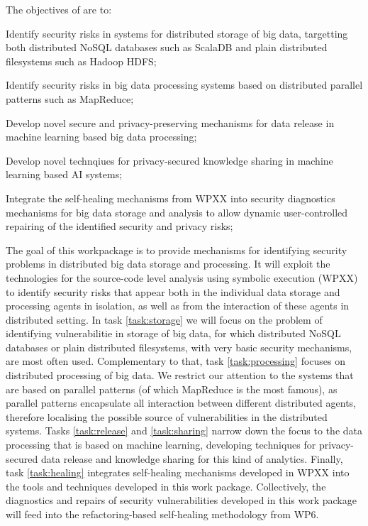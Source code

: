 \addtocounter{wpno}{1}
\begin{Workpackage}{\thewpno}
\WPTitle{\wpname{\thewpno}}


\begin{WPObjectives}
The objectives of \theWP{} are to:
\begin{compactitem}
\item Identify security risks in systems for distributed storage of big data, targetting both distributed NoSQL databases such as ScalaDB and plain distributed filesystems such as Hadoop HDFS;
\item Identify security risks in big data processing systems based on distributed parallel patterns such as MapReduce;
\item Develop novel secure and privacy-preserving mechanisms for data release in machine learning based big data processing; 
\item Develop novel technqiues for privacy-secured knowledge sharing in machine learning based AI systems; 
\item Integrate the self-healing mechanisms from WPXX into security diagnostics mechanisms for big data storage and analysis to allow dynamic user-controlled repairing of the identified security and privacy risks;  
\end{compactitem}
\end{WPObjectives}

\begin{WPDescription}
  The goal of this workpackage is to provide mechanisms for identifying security problems in distributed big data storage and processing. It will exploit the technologies for the source-code level analysis using symbolic execution (WPXX) to identify security risks that appear both in the individual data storage and processing agents in isolation, as well as from the interaction of these agents in distributed setting. In task \ref{task:storage} we will focus on the problem of identifying vulnerabilitie in storage of big data, for which distributed NoSQL databases or plain distributed filesystems, with very basic security mechanisms, are most often used. Complementary to that, task \ref{task:processing} focuses on distributed processing of big data. We restrict our attention to the systems that are based on parallel patterns (of which MapReduce is the most famous), as parallel patterns encapsulate all interaction between different distributed agents, therefore localising the possible source of vulnerabilities in the distributed systems. Tasks \ref{task:release} and \ref{task:sharing} narrow down the focus to the data processing that is based on machine learning, developing techniques for privacy-secured data release and knowledge sharing for this kind of analytics. Finally, task \ref{task:healing} integrates self-healing mechanisms developed in WPXX into the tools and techniques developed in this work package. Collectively, the diagnostics and repairs of security vulnerabilities developed in this work package will feed into the refactoring-based self-healing methodology from WP6. 
\end{WPDescription}


\end{Workpackage}
